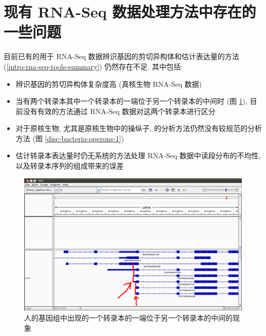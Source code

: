 \section{现有 RNA-Seq 数据处理方法中存在的一些问题}
目前已有的用于 RNA-Seq 数据辨识基因的剪切异构体和估计表达量的方法 
(\ref{intro-rna-seq-tools-summary}) 仍然存在不足. 
其中包括: 
\begin{itemize}
\item 辨识基因的剪切异构体复杂度高 (真核生物 RNA-Seq 数据)

\item 当有两个转录本其中一个转录本的一端位于另一个转录本的中间时 
(图 \ref{disc-human-gene-alternative-start-1}), 
目前没有有效的方法通过 RNA-Seq 数据对这两个转录本进行区分

\item 对于原核生物, 尤其是原核生物中的操纵子, 的分析方法仍然没有较规范的分析方法 
\cite{mcclure2013computational} (图 \ref{disc-bacteria-operons-1})

\item 估计转录本表达量时仍无系统的方法处理 RNA-Seq 数据中读段分布的不均性, 
以及转录本序列的组成带来的误差 \cite{oshlack2009transcript, jones2012new} 
\end{itemize}

\begin{figure}[!t]
\centering
\includegraphics[width=\textwidth]{figures/disc/disc-human-gene-alternative-start-1.png}
\caption{人的基因组中出现的一个转录本的一端位于另一个转录本的中间的现象}
\label{disc-human-gene-alternative-start-1}
\end{figure}

